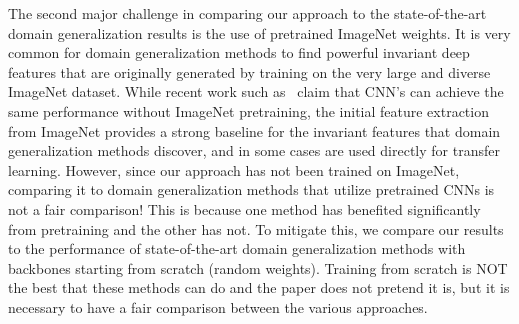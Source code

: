 The second major challenge in comparing our approach to the state-of-the-art domain generalization results is the use of pretrained ImageNet weights. It is very common for domain generalization methods to find powerful invariant deep features that are originally generated by training on the very large and diverse ImageNet dataset. While recent work such as~\cite{he2019rethinking} claim that CNN’s can achieve the same performance without ImageNet pretraining, the initial feature extraction from ImageNet provides a strong baseline for the invariant features that domain generalization methods discover, and in some cases are used directly for transfer learning. However, since our approach has not been trained on ImageNet, comparing it to domain generalization methods that utilize pretrained CNNs is not a fair comparison! This is because one method has benefited significantly from pretraining and the other has not. To mitigate this, we compare our results to the performance of state-of-the-art domain generalization methods with backbones starting from scratch (random weights). Training from scratch is NOT the best that these methods can do and the paper does not pretend it is, but it is necessary to have a fair comparison between the various approaches. 








